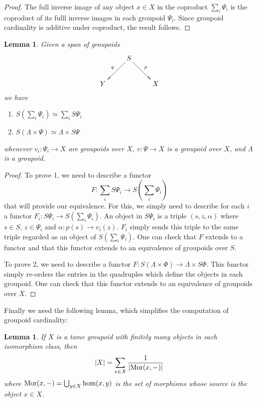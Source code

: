 \documentclass{article}
\renewcommand{\hom}{{\rm hom}}
\renewcommand{\to}{\rightarrow}
\newcommand{\maps}{\colon}
\newcommand{\Mor}{{\rm Mor}}
\newtheorem{lemma}[thm]{Lemma}
\begin{document}
\begin{proof}
The full inverse image of any object $x \in X$ in the coproduct
$\sum_i \Psi_i$ is the coproduct of its fulll inverse images in
each groupoid $\Psi_i$.  Since groupoid cardinality is additive under
coproduct, the result follows.
\end{proof}

\begin{lemma}
\label{linearity}
Given a span of groupoids 
\[
\xymatrix{
& S\ar[dl]_{q} \ar[dr]^{p} & \\
Y & & X
}
\]
we have
\begin{enumerate}
\item $S(\sum_i \Psi_i)\simeq \sum_i S\Psi_i$
\item $S(\Lambda\times \Psi)\simeq \Lambda\times S\Psi$
\end{enumerate}
whenever $v_i \maps \Psi_i \to X$ are groupoids over $X$,
$v \maps \Psi \to X$ is a groupoid over $X$, and 
$\Lambda$ is a groupoid.
\end{lemma}

\begin{proof}
To prove 1, we need to describe a functor
\[ 
F\maps \sum_i S \Psi_i \to S(\sum_i \Psi_i)
\]
that will provide our equivalence.  For this, we simply need to
describe for each $i$ a functor $F_i \maps S \Psi_i \to S(\sum_i
\Psi_i)$.  An object in $S \Psi_i$ is a triple $(s,z,\alpha)$ where $s
\in S$, $z \in \Psi_i$ and $\alpha \maps p(s) \to v_i(z)$.  $F_i$
simply sends this triple to the same triple regarded as an object of
$S(\sum_i \Psi_i)$.  One can check that $F$ extends to a functor and
that this functor extends to an equivalence of groupoids over $S$.

To prove 2, we need to describe a functor $F \maps S(\Lambda\times
\Phi) \to \Lambda\times S\Phi$.  This functor simply re-orders the
entries in the quadruples which define the objects in each groupoid.
One can check that this functor extends to an equivalence of groupoids
over $X$.
\end{proof}

\noindent
Finally we need the following lemma, which simplifies the computation
of groupoid cardinality:

\begin{lemma}\label{ALTCARD}
If $X$ is a tame groupoid with finitely many objects in each isomorphism
class, then 
\[ |X| 
= \sum_{x \in X} \frac{1}{|\Mor(x,-)|} \]
where $\Mor(x,-) = \bigcup_{y\in X}\hom(x,y)$ is
the set of morphisms whose source is the object $x \in X$.  
\end{lemma}
\end{document}
